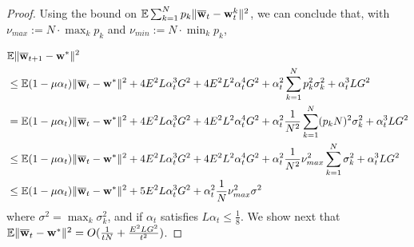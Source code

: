 \begin{proof}
\begin{comment}
	& \leq2\sigma^{2}+4\sum_{k}p_{k}\left(L^{2}\|\ov{w}_{t-1}-\vw_{t-1}^{k}\|^{2}+\|\nabla F_{k}(\ov{w}_{t-1})\|^{2}\right)
	\end{align*}
	so that 
	\begin{align*}
	\sum_{k=1}^{N}p_{k}\|\ov{w}_{t}-\vw_{t}^{k}\|^{2} & \leq2(1+4L^{2}\alpha_{t-1}^{2})\sum_{k=1}^{N}p_{k}\|\ov{w}_{t-1}-\vw_{t-1}^{k}\|^{2}+4\sigma^{2}\alpha_{t-1}^{2}+8\alpha_{t-1}^{2}\sum_{k}p_{k}\|\nabla F_{k}(\ov{w}_{t-1})\|^{2}
	\end{align*}
	and taking expectation, we have 
	\begin{align*}
	\mathbb{E}\sum_{k=1}^{N}p_{k}\|\ov{w}_{t}-\vw_{t}^{k}\|^{2} & \leq2(1+4L^{2}\alpha_{t-1}^{2})\mathbb{E}\sum_{k=1}^{N}p_{k}\|\ov{w}_{t-1}-\vw_{t-1}^{k}\|^{2}+4\alpha_{t-1}^{2}(\sigma^{2}+2G^{2})
	\end{align*}
	Using this recusive relation at most $E$ times to arrive at a communication
	round and that $\alpha_{t}L\leq1/8$ for all $t$, we have 
	\begin{align*}
	\mathbb{E}\sum_{k=1}^{N}p_{k}\|\ov{w}_{t}-\vw_{t}^{k}\|^{2}\leq E\frac{1}{L^{2}}(\sigma^{2}+2G^{2})
	\end{align*}
	which gives 
	\end{comment}
	{} 
	
	Using the bound on $\mathbb{E}\sum_{k=1}^{N}p_{k}\|{\overline{\mathbf{w}}}_{t}-{\mathbf{w}}_{t}^{k}\|^{2}$,
	we can conclude that, with $\nu_{max}:=N\cdot\max_{k}p_{k}$ and $\nu_{min}:=N\cdot\min_{k}p_{k}$, 
	
	\begin{align*}
	& \mathbb{E}\|{\overline{\mathbf{w}}}_{t+1}-{\mathbf{w}}^{\ast}\|^{2}\\
	& \leq\mathbb{E}(1-\mu\alpha_{t})\|{\overline{\mathbf{w}}}_{t}-{\mathbf{w}}^{\ast}\|^{2}+4E^{2}L\alpha_{t}^{3}G^{2}+4E^{2}L^{2}\alpha_{t}^{4}G^{2}+\alpha_{t}^{2}\sum_{k=1}^{N}p_{k}^{2}\sigma_{k}^{2}+\alpha_{t}^{3}LG^{2}\\
	& =\mathbb{E}(1-\mu\alpha_{t})\|{\overline{\mathbf{w}}}_{t}-{\mathbf{w}}^{\ast}\|^{2}+4E^{2}L\alpha_{t}^{3}G^{2}+4E^{2}L^{2}\alpha_{t}^{4}G^{2}+\alpha_{t}^{2}\frac{1}{N^{2}}\sum_{k=1}^{N}(p_{k}N)^{2}\sigma_{k}^{2}+\alpha_{t}^{3}LG^{2}\\
	& \leq\mathbb{E}(1-\mu\alpha_{t})\|{\overline{\mathbf{w}}}_{t}-{\mathbf{w}}^{\ast}\|^{2}+4E^{2}L\alpha_{t}^{3}G^{2}+4E^{2}L^{2}\alpha_{t}^{4}G^{2}+\alpha_{t}^{2}\frac{1}{N^{2}}\nu_{max}^{2}\sum_{k=1}^{N}\sigma_{k}^{2}+\alpha_{t}^{3}LG^{2}\\
	& \leq\mathbb{E}(1-\mu\alpha_{t})\|{\overline{\mathbf{w}}}_{t}-{\mathbf{w}}^{\ast}\|^{2}+5E^{2}L\alpha_{t}^{3}G^{2}+\alpha_{t}^{2}\frac{1}{N}\nu_{max}^{2}\sigma^{2}
	\end{align*}
	where $\sigma^{2}=\max_{k}\sigma_{k}^{2}$, and if $\alpha_{t}$
	satisfies $L\alpha_{t}\leq\frac{1}{8}$. We show next that $\mathbb{E}\|{\overline{\mathbf{w}}}_{t}-{\mathbf{w}}^{\ast}\|^{2}=O(\frac{1}{tN}+\frac{E^{2}LG^{2}}{t^{2}})$. 
	

\end{proof}
